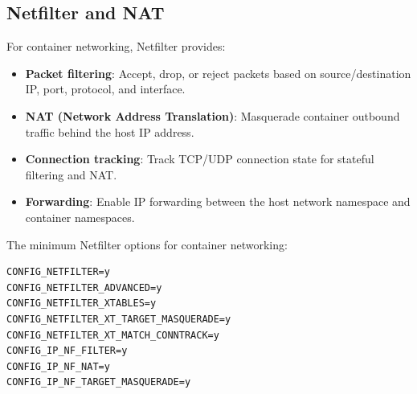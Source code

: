 \subsection{Netfilter and NAT}

For container networking, Netfilter provides:

\begin{itemize}[nosep]
  \item \textbf{Packet filtering}: Accept, drop, or reject packets based
        on source/destination IP, port, protocol, and interface.
  \item \textbf{NAT (Network Address Translation)}: Masquerade container
        outbound traffic behind the host IP address.
  \item \textbf{Connection tracking}: Track TCP/UDP connection state for
        stateful filtering and NAT.
  \item \textbf{Forwarding}: Enable IP forwarding between the host
        network namespace and container namespaces.
\end{itemize}

The minimum Netfilter options for container networking:

\begin{lstlisting}
CONFIG_NETFILTER=y
CONFIG_NETFILTER_ADVANCED=y
CONFIG_NETFILTER_XTABLES=y
CONFIG_NETFILTER_XT_TARGET_MASQUERADE=y
CONFIG_NETFILTER_XT_MATCH_CONNTRACK=y
CONFIG_IP_NF_FILTER=y
CONFIG_IP_NF_NAT=y
CONFIG_IP_NF_TARGET_MASQUERADE=y
\end{lstlisting}
